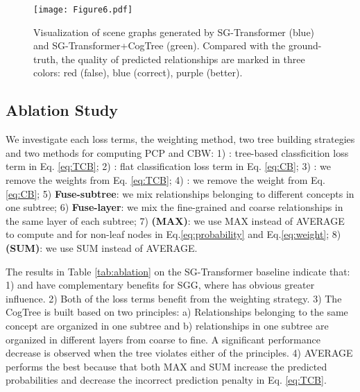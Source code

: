\documentclass{article}
\begin{document}
\begin{figure*}[t]
    \centering
    \texttt{[image: Figure6.pdf]}
    \caption{Visualization of scene graphs generated by SG-Transformer (blue) and SG-Transformer+CogTree (green). Compared with the ground-truth, the quality of predicted relationships are marked in three colors: red (false), blue (correct), purple (better).}
    \label{fig:cases}
\end{figure*}










\subsection{Ablation Study}
We investigate each loss terms, the weighting method,
two tree building strategies  and two methods for computing PCP and CBW: 1) :
tree-based classficition loss term in Eq. \ref{eq:TCB}; 2) : flat classification loss term in Eq. \ref{eq:CB}; 3) : we remove the weights  from Eq. \ref{eq:TCB}; 4)  : we remove the weight  from Eq. \ref{eq:CB}; 5) \textbf{Fuse-subtree}: we mix  relationships  belonging  to  different  concepts in one subtree; 6) \textbf{Fuse-layer}: we 
mix the fine-grained  and coarse relationships  in  the  same layer of
each subtree; 7) \textbf{(MAX)}: we use MAX instead of AVERAGE to compute  and  for non-leaf nodes in Eq.\ref{eq:probability} and Eq.\ref{eq:weight}; 8) \textbf{(SUM)}: we use SUM instead of AVERAGE. 

The results in Table \ref{tab:ablation} on the SG-Transformer baseline indicate that: 1)  and  have complementary benefits for SGG, where  has obvious greater influence. 2) Both of the loss terms benefit from the weighting strategy. 3) The CogTree is built based on two principles: a) Relationships belonging to the same concept are organized in one subtree and b) relationships in one subtree are organized in different layers from coarse to fine. A significant performance decrease 
is observed when the tree violates either of the principles. 4) AVERAGE performs the best because that both MAX and SUM increase the predicted probabilities and decrease the incorrect prediction penalty in Eq. \ref{eq:TCB}. 
\end{document}
